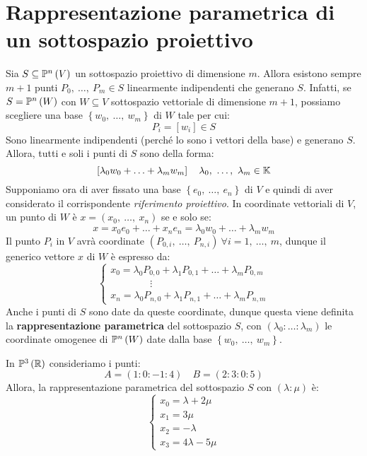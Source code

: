 \section{Rappresentazione parametrica di un sottospazio proiettivo}
Sia $S\subseteq\proj{V}$ un sottospazio proiettivo di dimensione $m$. Allora esistono sempre $m+1$ punti $P_0,\ \ldots,\ P_m\in S$ linearmente indipendenti che generano $S$. Infatti, se $S=\proj{W}$ con $W\subseteq V$ sottospazio vettoriale di dimensione $m+1$, possiamo scegliere una base $\left\{w_0,\ \ldots,\ w_m\right\}$ di $W$ tale per cui:
\begin{equation*}
	P_i=\left[w_i\right]\in S
\end{equation*}
Sono linearmente indipendenti (perché lo sono i vettori della base) e generano $S$.\\
Allora, tutti e soli i punti di $S$ sono della forma:
\begin{equation*}
	\left[\lambda_0 w_0+\ldots+\lambda_m w_m\right]\quad \lambda_0,\ \ldots,\ \lambda_m\in\kamp
\end{equation*}
Supponiamo ora di aver fissato una base $\left\{e_0,\ \ldots,\ e_n\right\}$ di $V$ e quindi di aver considerato il corrispondente \textit{riferimento proiettivo}. In coordinate vettoriali di $V$, un punto di $W$ è $x=\left(x_0,\ \ldots,\ x_n\right)$ se e solo se:
\begin{equation*}
	x=x_0e_0+\ldots+x_ne_n=\lambda_0 w_0+\ldots+\lambda_m w_m
\end{equation*}
Il punto $P_i$ in $V$ avrà coordinate $\left(P_{0,i},\ \ldots,\ P_{n,i}\right)\ \forall i=1,\ \ldots,\ m$, dunque il generico vettore $x$ di $W$ è espresso da:
\begin{equation}
	\begin{cases}
		x_0=\lambda_0 P_{0,0}+\lambda_1P_{0,1}+\ldots+\lambda_mP_{0,m}\\
		\qquad\qquad \vdots\\
		x_n=\lambda_0 P_{n,0}+\lambda_1P_{n,1}+\ldots+\lambda_mP_{n,m}
	\end{cases}
\end{equation}
Anche i punti di $S$ sono date da queste coordinate, dunque questa viene definita la \textbf{rappresentazione parametrica} del sottospazio $S$, con $\left(\lambda_0\colon\ldots\colon\lambda_m\right)$ le coordinate omogenee di $\proj{W}$ date dalla base $\left\{w_0,\ \ldots,\ w_m\right\}$.
\begin{example}
	In $\proj[3]{\realset}$ consideriamo i punti:
	\begin{equation*}
		A=\left(1\colon 0\colon -1\colon 4\right)\quad B=\left(2\colon 3\colon 0\colon 5\right)
	\end{equation*}
Allora, la rappresentazione parametrica del sottospazio $S$ con $\left(\lambda\colon \mu\right)$ è:
\begin{equation*}
	\begin{cases}
		x_0=\lambda+2\mu\\
		x_1=3\mu\\
		x_2=-\lambda\\
		x_3=4\lambda-5\mu
	\end{cases}
\end{equation*}
\end{example}
